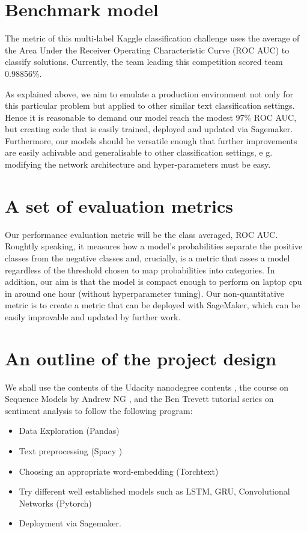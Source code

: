 \documentclass{report}
\begin{document}
\section{Benchmark model}

The metric of this multi-label Kaggle classification challenge 
uses the average of the  Area Under the Receiver Operating Characteristic Curve (ROC AUC) to 
 classify solutions. Currently, the team leading this competition scored team 0.98856\%.

As explained above, we aim to emulate a production 
environment not only for this particular problem but applied to other similar text
classification settings. Hence it is reasonable to demand our model reach the modest 97\% ROC AUC, 
but creating code that is easily trained, deployed and updated via Sagemaker. Furthermore, our 
models should be versatile enough that further improvements are easily achivable and 
generalisable to other classification settings, e g. modifying the network architecture and hyper-parameters 
must be easy.

\section{A set of evaluation metrics}

Our performance evaluation metric will be the class averaged, ROC AUC. Roughtly speaking, it measures 
how a model's probabilities separate the positive classes  from the negative classes and, crucially,
is a metric that asses a model regardless of the threshold chosen to map probabilities into categories. In addition, our aim 
is that the model is compact enough to perform on laptop cpu in around one hour (without hyperparameter tuning). 
Our non-quantitative metric is to create a metric that can be deployed with SageMaker, which can be easily improvable and updated by further work.


\section{An outline of the project design}

We shall use the contents of the Udacity nanodegree contents \cite{ND}, 
the course on Sequence Models by Andrew NG \cite{NG}, and the 
Ben Trevett tutorial  series on sentiment analysis \cite{BT} to follow the following program:
\begin{itemize}
\item Data Exploration (Pandas)
\item Text preprocessing (Spacy \cite{Spacy})
\item Choosing an appropriate word-embedding (Torchtext)
\item Try different well established models such as LSTM, GRU, Convolutional Networks (Pytorch)
\item Deployment via Sagemaker.
\end{itemize}



\end{document}
